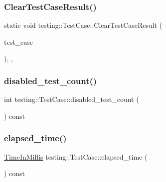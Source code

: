 \subsubsection{\texorpdfstring{ClearTestCaseResult()}{ClearTestCaseResult()}}
{\footnotesize\ttfamily static void testing\+::\+Test\+Case\+::\+Clear\+Test\+Case\+Result (\begin{DoxyParamCaption}\item[{\mbox{\hyperlink{classtesting_1_1_test_case}{Test\+Case}} $\ast$}]{test\+\_\+case }\end{DoxyParamCaption})\hspace{0.3cm}{\ttfamily [inline]}, {\ttfamily [static]}, {\ttfamily [private]}}

\mbox{\label{classtesting_1_1_test_case_a8ef690ab8ec74d02c99416637de71ae8}} 
\subsubsection{\texorpdfstring{disabled\_test\_count()}{disabled\_test\_count()}}
{\footnotesize\ttfamily int testing\+::\+Test\+Case\+::disabled\+\_\+test\+\_\+count (\begin{DoxyParamCaption}{ }\end{DoxyParamCaption}) const}

\mbox{\label{classtesting_1_1_test_case_acd7d6a77bce06da6ef90f5dad1c4def1}} 
\subsubsection{\texorpdfstring{elapsed\_time()}{elapsed\_time()}}
{\footnotesize\ttfamily \mbox{\hyperlink{namespacetesting_a992de1d091ce660f451d1e8b3ce30fd6}{Time\+In\+Millis}} testing\+::\+Test\+Case\+::elapsed\+\_\+time (\begin{DoxyParamCaption}{ }\end{DoxyParamCaption}) const\hspace{0.3cm}{\ttfamily [inline]}}

\mbox{\label{classtesting_1_1_test_case_ae71c30eab6f1673b82090a0e745c2aa5}} 
